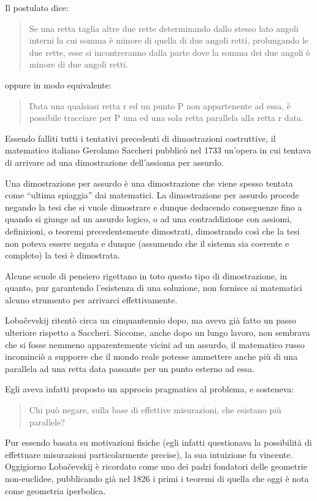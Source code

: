 \documentclass[a4paper,10pt]{article}
\begin{document}
Il postulato dice: \cite{wp-elementi-euclide}
\begin{quote}
 Se una retta taglia altre due rette determinando dallo stesso lato angoli interni la cui somma è minore di quella di due angoli retti, prolungando le due rette, esse si incontreranno dalla parte dove la somma dei due angoli è minore di due angoli retti.
\end{quote}
oppure in modo equivalente:
\begin{quote}
 Data una qualsiasi retta r ed un punto P non appartenente ad essa, è possibile tracciare per P una ed una sola retta parallela alla retta r data.
\end{quote}

Essendo falliti tutti i tentativi precedenti di dimostrazioni costruttive, il matematico italiano Gerolamo Saccheri pubblicò nel 1733 un'opera in cui tentava di arrivare ad una dimostrazione dell'assioma per assurdo.

Una dimostrazione per assurdo è una dimostrazione che viene spesso tentata come “ultima spiaggia” dai matematici. La dimostrazione per assurdo procede negando la tesi che si vuole dimostrare e dunque deducendo conseguenze fino a quando si giunge ad un assurdo logico, o ad una contraddizione con assiomi, definizioni, o teoremi precedentemente dimostrati, dimostrando così che la tesi non poteva essere negata e dunque (assumendo che il sistema sia coerente e completo) la tesi è dimostrata.

Alcune scuole di pensiero rigettano in toto questo tipo di dimostrazione, in quanto, pur garantendo l'esistenza di una soluzione, non fornisce ai matematici alcuno strumento per arrivarci effettivamente.

Lobačevskij ritentò circa un cinquantennio dopo, ma aveva già fatto un passo ulteriore rispetto a Saccheri. Siccome, anche dopo un lungo lavoro, non sembrava che si fosse nemmeno apparentemente vicini ad un assurdo, il matematico russo incominciò a supporre che il mondo reale potesse ammettere anche più di una parallela ad una retta data passante per un punto esterno ad essa.

Egli aveva infatti proposto un approcio pragmatico al problema, e sosteneva:
\begin{quote}
Chi può negare, sulla base di effettive misurazioni, che esistano più parallele?
\end{quote}
Pur essendo basata su motivazioni fisiche (egli infatti questionava la possibilità di effettuare misurazioni particolarmente precise), la sua intuizione fu vincente. Oggigiorno Lobačevskij è ricordato come uno dei padri fondatori delle geometrie non-euclidee, pubblicando già nel 1826 i primi i teoremi di quella che oggi è nota come geometria iperbolica. \nocite{wp-geometria-iperbolica}
\end{document}
